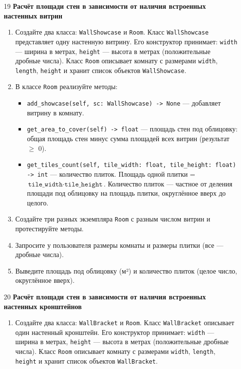 \begin{enumerate}
\item[19] \textbf{Расчёт площади стен в зависимости от наличия встроенных настенных витрин}
\begin{enumerate}
    \item Создайте два класса: \texttt{WallShowcase} и \texttt{Room}.  
    Класс \texttt{WallShowcase} представляет одну настенную витрину. Его конструктор принимает:  
    \texttt{width} — ширина в метрах,  
    \texttt{height} — высота в метрах (положительные дробные числа).  
    Класс \texttt{Room} описывает комнату с размерами \texttt{width}, \texttt{length}, \texttt{height} и хранит список объектов \texttt{WallShowcase}.

    \item В классе \texttt{Room} реализуйте методы:  
    \begin{itemize}
        \item \texttt{add\_showcase(self, sc: WallShowcase) -> None} — добавляет витрину в комнату.
        \item \texttt{get\_area\_to\_cover(self) -> float} — площадь стен под облицовку: общая площадь стен минус сумма площадей всех витрин (результат $\geqslant$ 0).
        \item \texttt{get\_tiles\_count(self, tile\_width: float, tile\_height: float) -> int} — количество плиток. Площадь одной плитки = \(\texttt{tile\_width} \cdot \texttt{tile\_height}\). Количество плиток — частное от деления площади под облицовку на площадь плитки, округлённое вверх до целого.
    \end{itemize}

    \item Создайте три разных экземпляра \texttt{Room} с разным числом витрин и протестируйте методы.

    \item Запросите у пользователя размеры комнаты и размеры плитки (все — дробные числа).

    \item Выведите площадь под облицовку (м²) и количество плиток (целое число, округлённое вверх).
\end{enumerate}

\item[20] \textbf{Расчёт площади стен в зависимости от наличия встроенных настенных кронштейнов}
\begin{enumerate}
    \item Создайте два класса: \texttt{WallBracket} и \texttt{Room}.  
    Класс \texttt{WallBracket} описывает один настенный кронштейн. Его конструктор принимает:  
    \texttt{width} — ширина в метрах,  
    \texttt{height} — высота в метрах (положительные дробные числа).  
    Класс \texttt{Room} описывает комнату с размерами \texttt{width}, \texttt{length}, \texttt{height} и хранит список объектов \texttt{WallBracket}.


\end{enumerate}
\end{enumerate}
